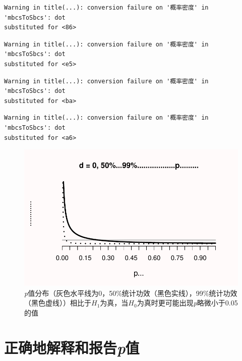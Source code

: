 \documentclass[
  letterpaper,
  DIV=11,
  numbers=noendperiod]{scrreprt}
\begin{document}
\begin{verbatim}
Warning in title(...): conversion failure on '概率密度' in 'mbcsToSbcs': dot
substituted for <86>
\end{verbatim}

\begin{verbatim}
Warning in title(...): conversion failure on '概率密度' in 'mbcsToSbcs': dot
substituted for <e5>
\end{verbatim}

\begin{verbatim}
Warning in title(...): conversion failure on '概率密度' in 'mbcsToSbcs': dot
substituted for <ba>
\end{verbatim}

\begin{verbatim}
Warning in title(...): conversion failure on '概率密度' in 'mbcsToSbcs': dot
substituted for <a6>
\end{verbatim}

\begin{figure}

{\centering \includegraphics[width=1\textwidth,height=\textheight]{01-pvalue_files/figure-pdf/fig-paradox-1.pdf}

}

\caption{\label{fig-paradox}\emph{p}值分布（灰色水平线为0，50\%统计功效（黑色实线），99\%统计功效（黑色虚线））相比于\(H_1\)为真，当\(H_0\)为真时更可能出现\emph{p}略微小于0.05的值}

\end{figure}

\hypertarget{sec-correctlyinterpreting}{%
\section{\texorpdfstring{正确地解释和报告\emph{p}值}{正确地解释和报告p值}}\label{sec-correctlyinterpreting}}
\end{document}

